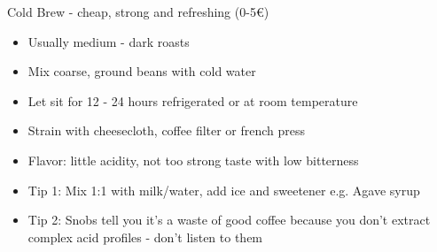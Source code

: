 \documentclass[10pt,graphics,aspectratio=169,table]{beamer}
\begin{document}
\begin{frame}{Cold Brew - cheap, strong and refreshing (0-5€)}
    \begin{itemize}
        \item Usually medium - dark roasts
        \item Mix coarse, ground beans with cold water
        \item Let sit for 12 - 24 hours refrigerated or at room temperature
        \item Strain with cheesecloth, coffee filter or french press
        \item Flavor: little acidity, not too strong taste with low bitterness
        \item Tip 1: Mix 1:1 with milk/water, add ice and sweetener e.g. Agave syrup
        \item Tip 2: Snobs tell you it's a waste of good coffee because you don't extract complex acid profiles - don't listen to them
    \end{itemize}
\end{frame}
\end{document}
